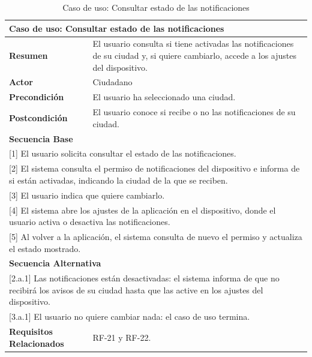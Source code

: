 \begin{table}[h!]
    \centering
    \renewcommand{\arraystretch}{1.5}

    \begin{tabular}{|p{4cm}|p{11cm}|}
        \hline
        \multicolumn{2}{|l|}{\textbf{Caso de uso: Consultar estado de las notificaciones}} \\
        \hline
        \textbf{Resumen} & El usuario consulta si tiene activadas las notificaciones de su ciudad y, si quiere cambiarlo, accede a los ajustes del dispositivo. \\
        \hline
        \textbf{Actor} & Ciudadano \\
        \hline
        \textbf{Precondición} & El usuario ha seleccionado una ciudad. \\
        \hline
        \textbf{Postcondición} & El usuario conoce si recibe o no las notificaciones de su ciudad. \\
        \hline
        \multicolumn{2}{|l|}{\textbf{Secuencia Base}} \\
        \hline
        \multicolumn{2}{|p{15cm}|}{ [1] El usuario solicita consultar el estado de las notificaciones. } \\
        \hline
        \multicolumn{2}{|p{15cm}|}{ [2] El sistema consulta el permiso de notificaciones del dispositivo e informa de si están activadas, indicando la ciudad de la que se reciben. } \\
        \hline
        \multicolumn{2}{|p{15cm}|}{ [3] El usuario indica que quiere cambiarlo. } \\
        \hline
        \multicolumn{2}{|p{15cm}|}{ [4] El sistema abre los ajustes de la aplicación en el dispositivo, donde el usuario activa o desactiva las notificaciones. } \\
        \hline
        \multicolumn{2}{|p{15cm}|}{ [5] Al volver a la aplicación, el sistema consulta de nuevo el permiso y actualiza el estado mostrado. } \\
        \hline
        \multicolumn{2}{|l|}{\textbf{Secuencia Alternativa}} \\
        \hline
        \multicolumn{2}{|p{15cm}|}{ [2.a.1] Las notificaciones están desactivadas: el sistema informa de que no recibirá los avisos de su ciudad hasta que las active en los ajustes del dispositivo. } \\
        \hline
        \multicolumn{2}{|p{15cm}|}{ [3.a.1] El usuario no quiere cambiar nada: el caso de uso termina. } \\
        \hline
        \textbf{Requisitos Relacionados} & RF-21 y RF-22. \\
        \hline
    \end{tabular}
    \caption{Caso de uso: Consultar estado de las notificaciones}
\end{table}

